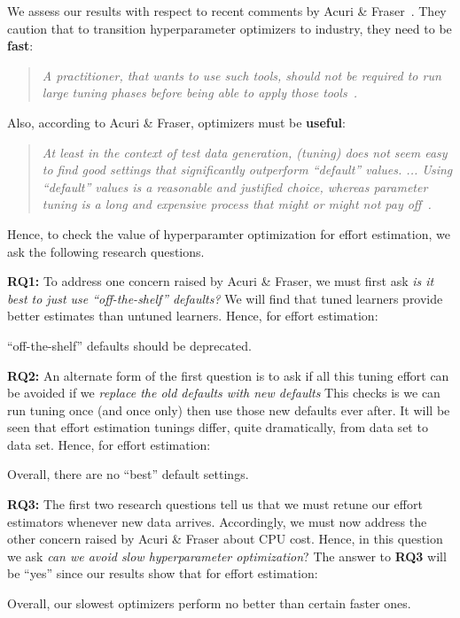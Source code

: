 We assess our results with respect to recent comments by 
Acuri \& Fraser~\cite{Arcuri2013}.
They caution that to transition hyperparameter optimizers  to industry,   they need to be {\bf  fast}:
\begin{quote}
{\em  
A practitioner, that wants to use such tools, should not be required to run large tuning phases before being able to apply those tools~\cite{Arcuri2013}.}
\end{quote}
Also,  according to Acuri \& Fraser, optimizers must  be {\bf useful}:
\begin{quote}
{\em At least in the context of test data generation, (tuning) does not seem easy to find good settings that significantly outperform   ``default'' values. ... Using ``default'' values is a reasonable and justified choice, whereas parameter tuning is a long and expensive process that might or might not pay off~\cite{Arcuri2013}.}
\end{quote}
Hence, to  check the value of hyperparamter optimization for effort estimation, we ask the following research questions.


{\bf RQ1:} To address one concern raised by Acuri \& Fraser,
 we must  first ask {\em is it best   to just  use ``off-the-shelf'' defaults?}
We will find that  tuned learners
provide  better estimates  than untuned learners. Hence, for effort estimation:
 \begin{result}{1}
 ``off-the-shelf'' defaults should be deprecated.
 \end{result}

{\bf RQ2:} An alternate form of the first question is to ask if all this tuning
 effort can be avoided if   we {\em  replace the old defaults with new defaults}
 This  checks is we can run tuning once (and once only) then use those new defaults
 ever after. It will be seen that effort estimation tunings differ, quite dramatically,
 from data set to data set. Hence, for effort estimation:
 \begin{result}{2}
 Overall, there are no ``best'' default settings.
 \end{result}

{\bf RQ3:}  The first two research questions tell us that we must retune
our effort estimators whenever new data arrives. Accordingly, we must now address the other concern raised by Acuri \& Fraser
about CPU cost. Hence, in this question we ask   {\em can we avoid  
slow hyperparameter optimization}? The answer to  {\bf RQ3} will be ``yes'' since
our results show that for effort estimation:
 \begin{result}{3}
 Overall, our slowest optimizers  perform no better than certain faster ones.
 \end{result}


